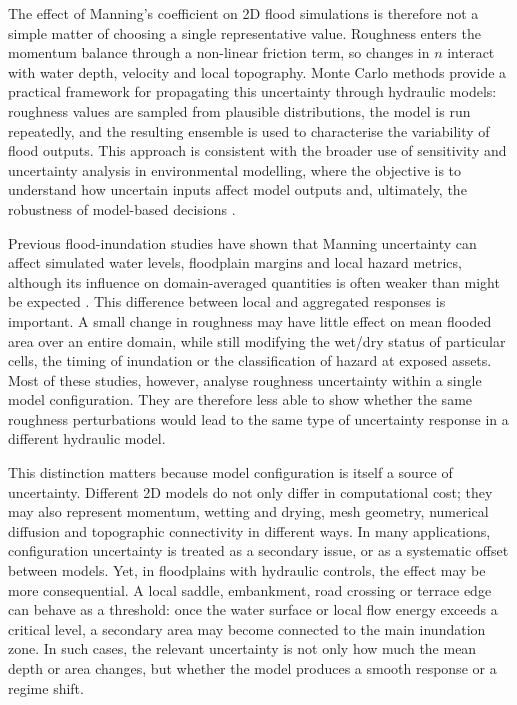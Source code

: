 \documentclass[a4paper,fleqn]{cas-sc}
\newcommand{\nman}{$n$}
\begin{document}
The effect of Manning's coefficient on 2D flood simulations is therefore not a simple matter of choosing a single representative value. Roughness enters the momentum balance through a non-linear friction term, so changes in \nman{} interact with water depth, velocity and local topography. Monte Carlo methods provide a practical framework for propagating this uncertainty through hydraulic models: roughness values are sampled from plausible distributions, the model is run repeatedly, and the resulting ensemble is used to characterise the variability of flood outputs. This approach is consistent with the broader use of sensitivity and uncertainty analysis in environmental modelling, where the objective is to understand how uncertain inputs affect model outputs and, ultimately, the robustness of model-based decisions \citep{saltelli2010,pianosi2016}.

Previous flood-inundation studies have shown that Manning uncertainty can affect simulated water levels, floodplain margins and local hazard metrics, although its influence on domain-averaged quantities is often weaker than might be expected \citep{aronica2002,hall2005,pappenberger2005,fewtrell2011,savage2016}. This difference between local and aggregated responses is important. A small change in roughness may have little effect on mean flooded area over an entire domain, while still modifying the wet/dry status of particular cells, the timing of inundation or the classification of hazard at exposed assets. Most of these studies, however, analyse roughness uncertainty within a single model configuration. They are therefore less able to show whether the same roughness perturbations would lead to the same type of uncertainty response in a different hydraulic model.

This distinction matters because model configuration is itself a source of uncertainty. Different 2D models do not only differ in computational cost; they may also represent momentum, wetting and drying, mesh geometry, numerical diffusion and topographic connectivity in different ways. In many applications, configuration uncertainty is treated as a secondary issue, or as a systematic offset between models. Yet, in floodplains with hydraulic controls, the effect may be more consequential. A local saddle, embankment, road crossing or terrace edge can behave as a threshold: once the water surface or local flow energy exceeds a critical level, a secondary area may become connected to the main inundation zone. In such cases, the relevant uncertainty is not only how much the mean depth or area changes, but whether the model produces a smooth response or a regime shift.
\end{document}
